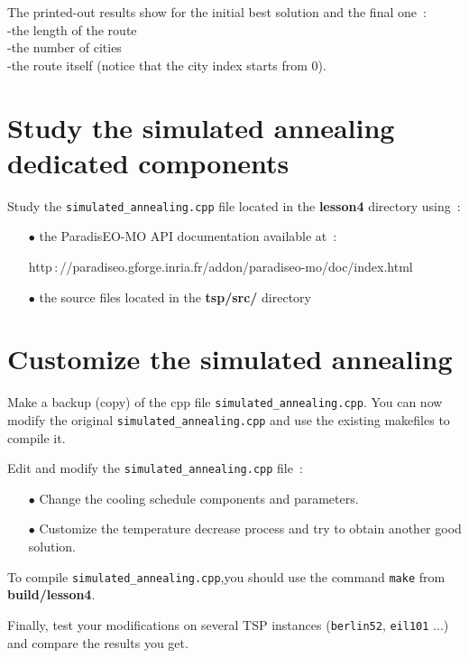 \documentclass[a4paper]{article}
\begin{document}
    The printed-out results show for the initial best solution and the final one~:
    \\ \hspace*{0.5cm}-the length of the route
    \\ \hspace*{0.5cm}-the number of cities
    \\ \hspace*{0.5cm}-the route itself (notice that the city index starts from 0).


\section{Study the simulated annealing dedicated components}

    Study the {\tt simulated\_annealing.cpp} file located in the {\bf lesson4} directory
    using~:
    \begin{itemize}
       \item[$\bullet$] the ParadisEO-MO API documentation available at~:

       \hspace{1cm}http$\,:$//paradiseo.gforge.inria.fr/addon/paradiseo-mo/doc/index.html
       \item[$\bullet$] the source files located in the {\bf tsp/src/} directory
    \end{itemize}

\section{Customize the simulated annealing}

   Make a backup (copy) of the cpp file {\tt simulated\_annealing.cpp}. You can now modify the
   original {\tt simulated\_annealing.cpp} and use the existing makefiles to compile it.

     Edit and modify the {\tt simulated\_annealing.cpp} file~:
    \begin{itemize}
       \item[$\bullet$] Change the cooling schedule components and parameters.
       \item[$\bullet$] Customize the temperature decrease process and try to obtain another good solution.
    \end{itemize}

    \smallskip
    To compile {\tt simulated\_annealing.cpp},you should use the
    command {\tt make} from {\bf build/lesson4}.

    \medskip
    Finally, test your modifications on several TSP instances ({\tt berlin52},
    {\tt eil101} ...) and compare the results you get.
\end{document}
